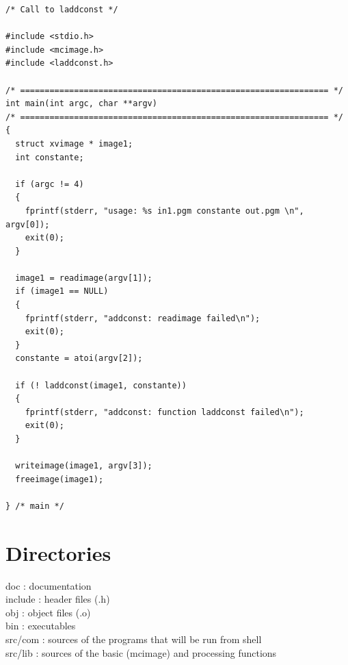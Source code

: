 \documentclass{article}
\begin{document}
\begin{verbatim}
/* Call to laddconst */

#include <stdio.h>
#include <mcimage.h>
#include <laddconst.h>

/* =============================================================== */
int main(int argc, char **argv) 
/* =============================================================== */
{
  struct xvimage * image1;
  int constante;

  if (argc != 4)
  {
    fprintf(stderr, "usage: %s in1.pgm constante out.pgm \n", argv[0]);
    exit(0);
  }

  image1 = readimage(argv[1]);  
  if (image1 == NULL)
  {
    fprintf(stderr, "addconst: readimage failed\n");
    exit(0);
  }
  constante = atoi(argv[2]);

  if (! laddconst(image1, constante))
  {
    fprintf(stderr, "addconst: function laddconst failed\n");
    exit(0);
  }

  writeimage(image1, argv[3]);
  freeimage(image1);

} /* main */
\end{verbatim}

\section{Directories}

doc      : documentation\\
include  : header files (.h)\\
obj      : object files (.o)\\
bin      : executables\\
src/com  : sources of the programs that will be run from shell\\
src/lib  : sources of the basic (mcimage) and processing functions
\end{document}
